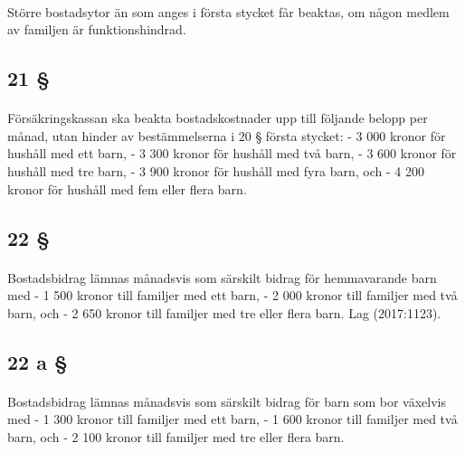 \documentclass[a4paper,notitlepage,openany,10pt]{book}
\begin{document}
\paragraph*{}
Större bostadsytor än som anges i första stycket får beaktas, om någon medlem av familjen är funktionshindrad.
\subsection*{21 §}
\paragraph*{}
Försäkringskassan ska beakta bostadskostnader upp till följande belopp per månad, utan hinder av bestämmelserna i 20 § första stycket:
\newline - 3 000 kronor för hushåll med ett barn,
\newline - 3 300 kronor för hushåll med två barn,
\newline - 3 600 kronor för hushåll med tre barn,
\newline - 3 900 kronor för hushåll med fyra barn, och
\newline - 4 200 kronor för hushåll med fem eller flera barn.
\subsection*{22 §}
\paragraph*{}
Bostadsbidrag lämnas månadsvis som särskilt bidrag för hemmavarande barn med
\newline - 1 500 kronor till familjer med ett barn,
\newline - 2 000 kronor till familjer med två barn, och
\newline - 2 650 kronor till familjer med tre eller flera barn.
Lag (2017:1123).
\subsection*{22 a §}
\paragraph*{}
Bostadsbidrag lämnas månadsvis som särskilt bidrag för barn som bor växelvis med
\newline - 1 300 kronor till familjer med ett barn,
\newline - 1 600 kronor till familjer med två barn, och
\newline - 2 100 kronor till familjer med tre eller flera barn.
\end{document}
